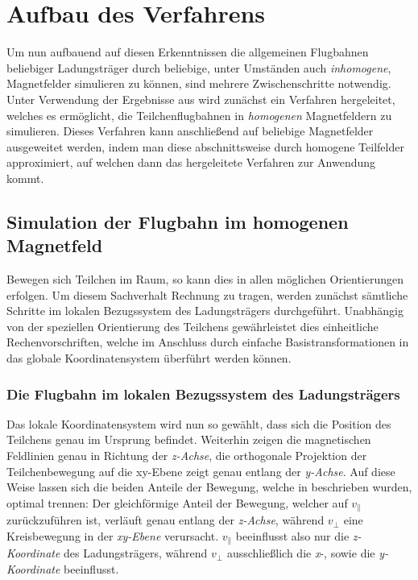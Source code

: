 \chapter{Aufbau des Verfahrens}

Um nun aufbauend auf diesen Erkenntnissen die allgemeinen Flugbahnen beliebiger Ladungstr\"ager durch beliebige, unter Umst\"anden
auch \textit{inhomogene}, Magnetfelder simulieren zu k\"onnen, sind mehrere Zwischenschritte notwendig.
Unter Verwendung der Ergebnisse aus  wird zun\"achst ein Verfahren hergeleitet, welches es erm\"oglicht,
die Teilchenflugbahnen in \textit{homogenen} Magnetfeldern zu simulieren. Dieses Verfahren kann anschlie{\ss}end auf beliebige
Magnetfelder ausgeweitet werden, indem man diese abschnittsweise durch homogene Teilfelder approximiert, auf welchen dann das
hergeleitete Verfahren zur Anwendung kommt.

\section{Simulation der Flugbahn im homogenen Magnetfeld}

Bewegen sich Teilchen im Raum, so kann dies in allen m\"oglichen Orientierungen erfolgen. Um diesem Sachverhalt Rechnung zu tragen,
werden zun\"achst s\"amtliche Schritte im lokalen Bezugssystem des Ladungstr\"agers durchgef\"uhrt. Unabh\"angig von der speziellen
Orientierung des Teilchens gew\"ahrleistet dies einheitliche Rechenvorschriften, welche im Anschluss durch einfache
Basistransformationen in das globale Koordinatensystem \"uberf\"uhrt werden k\"onnen.

\subsection{Die Flugbahn im lokalen Bezugssystem des Ladungstr\"agers}

Das lokale Koordinatensystem wird nun so gew\"ahlt, dass sich die Position des Teilchens genau im Ursprung befindet.
Weiterhin zeigen die magnetischen
Feldlinien genau in Richtung der \textit{z-Achse}, die orthogonale Projektion der Teilchenbewegung auf die xy-Ebene zeigt genau
entlang der \textit{y-Achse}. Auf diese Weise lassen sich die beiden Anteile der Bewegung, welche in 
beschrieben wurden, optimal trennen: Der gleichf\"ormige Anteil der Bewegung, welcher auf \(v_\parallel\) zur\"uckzuf\"uhren ist,
verl\"auft genau entlang der \textit{z-Achse}, w\"ahrend \(v_\perp\) eine Kreisbewegung in der \textit{xy-Ebene} verursacht.
\(v_\parallel\) beeinflusst also nur die \textit{z-Koordinate} des Ladungstr\"agers, w\"ahrend \(v_\perp\) ausschlie{\ss}lich die
\textit{x}-, sowie die \textit{y-Koordinate} beeinflusst.

